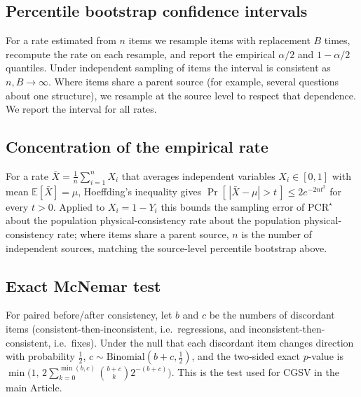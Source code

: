 \documentclass[11pt]{article}
\begin{document}
\subsection{Percentile bootstrap confidence intervals}
For a rate estimated from $n$ items we resample items with replacement $B$ times,
recompute the rate on each resample, and report the empirical $\alpha/2$ and
$1-\alpha/2$ quantiles. Under independent sampling of items the interval is consistent
as $n,B\to\infty$. Where items share a parent source (for example, several questions
about one structure), we resample at the source level to respect that dependence. We
report the interval for all rates.

\subsection{Concentration of the empirical rate}
For a rate $\bar X=\frac1n\sum_{i=1}^n X_i$ that averages independent variables
$X_i\in[0,1]$ with mean $\mathbb{E}[\bar X]=\mu$, Hoeffding's inequality gives
$\Pr[\,|\bar X-\mu|>t\,]\le 2e^{-2nt^2}$ for every $t>0$. Applied to $X_i=1-Y_i$ this
bounds the sampling error of $\mathrm{PCR}^\star$ about the population physical-consistency
rate about the population physical-consistency rate; where items share a parent source,
$n$ is the number of independent sources, matching the source-level percentile bootstrap
above.

\subsection{Exact McNemar test}
For paired before/after consistency, let $b$ and $c$ be the numbers of discordant items
(consistent-then-inconsistent, i.e.\ regressions, and inconsistent-then-consistent,
i.e.\ fixes). Under the null that each discordant item changes direction with
probability $\tfrac12$, $c\sim\mathrm{Binomial}(b+c,\tfrac12)$, and the two-sided exact
$p$-value is $\min\!\big(1,\,2\sum_{k=0}^{\min(b,c)}\binom{b+c}{k}2^{-(b+c)}\big)$. This
is the test used for CGSV in the main Article.
\end{document}
